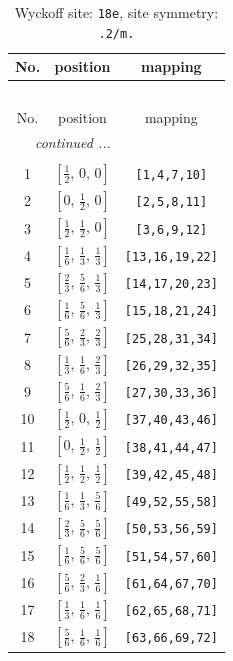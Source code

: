 \documentclass[fleqn,8pt]{jsarticle}
\begin{document}
\renewcommand{\arraystretch}{1.2}
\begin{longtable}{ccc}
\caption{Wyckoff site: {\tt 18e}, site symmetry: {\tt .2/m.}}
 \\
 \hline \hline
No. & position & mapping \\ \hline \endfirsthead

\multicolumn{2}{l}{\tablename\ \thetable{}} \\
 \hline \hline
No. & position & mapping \\ \hline \endhead

 \hline \hline
\multicolumn{2}{r}{\footnotesize\it continued ...} \\ \endfoot

 \hline \hline
\multicolumn{2}{r}{} \\ \endlastfoot

1 & $\left[ \frac{1}{2},\, 0,\, 0 \right]$ & {\tt [1,4,7,10]} \\ \hline
2 & $\left[ 0,\, \frac{1}{2},\, 0 \right]$ & {\tt [2,5,8,11]} \\ \hline
3 & $\left[ \frac{1}{2},\, \frac{1}{2},\, 0 \right]$ & {\tt [3,6,9,12]} \\ \hline
4 & $\left[ \frac{1}{6},\, \frac{1}{3},\, \frac{1}{3} \right]$ & {\tt [13,16,19,22]} \\ \hline
5 & $\left[ \frac{2}{3},\, \frac{5}{6},\, \frac{1}{3} \right]$ & {\tt [14,17,20,23]} \\ \hline
6 & $\left[ \frac{1}{6},\, \frac{5}{6},\, \frac{1}{3} \right]$ & {\tt [15,18,21,24]} \\ \hline
7 & $\left[ \frac{5}{6},\, \frac{2}{3},\, \frac{2}{3} \right]$ & {\tt [25,28,31,34]} \\ \hline
8 & $\left[ \frac{1}{3},\, \frac{1}{6},\, \frac{2}{3} \right]$ & {\tt [26,29,32,35]} \\ \hline
9 & $\left[ \frac{5}{6},\, \frac{1}{6},\, \frac{2}{3} \right]$ & {\tt [27,30,33,36]} \\ \hline
10 & $\left[ \frac{1}{2},\, 0,\, \frac{1}{2} \right]$ & {\tt [37,40,43,46]} \\ \hline
11 & $\left[ 0,\, \frac{1}{2},\, \frac{1}{2} \right]$ & {\tt [38,41,44,47]} \\ \hline
12 & $\left[ \frac{1}{2},\, \frac{1}{2},\, \frac{1}{2} \right]$ & {\tt [39,42,45,48]} \\ \hline
13 & $\left[ \frac{1}{6},\, \frac{1}{3},\, \frac{5}{6} \right]$ & {\tt [49,52,55,58]} \\ \hline
14 & $\left[ \frac{2}{3},\, \frac{5}{6},\, \frac{5}{6} \right]$ & {\tt [50,53,56,59]} \\ \hline
15 & $\left[ \frac{1}{6},\, \frac{5}{6},\, \frac{5}{6} \right]$ & {\tt [51,54,57,60]} \\ \hline
16 & $\left[ \frac{5}{6},\, \frac{2}{3},\, \frac{1}{6} \right]$ & {\tt [61,64,67,70]} \\ \hline
17 & $\left[ \frac{1}{3},\, \frac{1}{6},\, \frac{1}{6} \right]$ & {\tt [62,65,68,71]} \\ \hline
18 & $\left[ \frac{5}{6},\, \frac{1}{6},\, \frac{1}{6} \right]$ & {\tt [63,66,69,72]} \\
\end{longtable}
\end{document}
